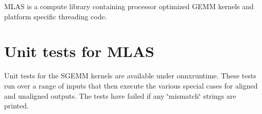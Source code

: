 M\+L\+AS is a compute library containing processor optimized G\+E\+MM kernels and platform specific threading code.

\section*{Unit tests for M\+L\+AS}

Unit tests for the S\+G\+E\+MM kernels are available under onnxruntime. These tests run over a range of inputs that then execute the various special cases for aligned and unaligned outputs. The tests have failed if any \char`\"{}mismatch\char`\"{} strings are printed. 